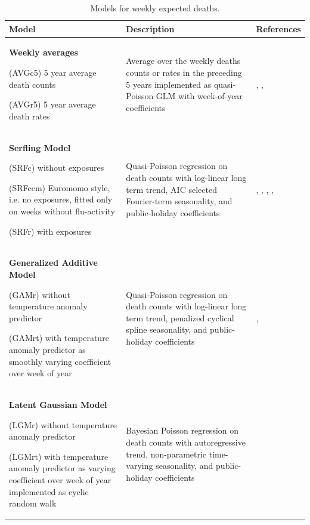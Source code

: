 \documentclass[12pt]{article}
\begin{document}
\begin{table}[H]
\small
\caption{Models for weekly expected deaths.}
\label{tab:models}
\begin{tabularx}{\textwidth} {
  >{\raggedright\arraybackslash}X
  >{\raggedright\arraybackslash}X
  >{\raggedright\arraybackslash}X }
\toprule
\textbf{Model} & \textbf{Description} & \textbf{References} \\ \midrule
\textbf{Weekly averages}\par
(AVGc5) 5 year average death counts\par
(AVGr5) 5 year average death rates
 &
 Average over the weekly deaths counts or rates in the preceding 5 years implemented as quasi-Poisson GLM with week-of-year coefficients
 &
\cite{Modig2020}, \cite{Stang2020}, \cite{Campbell2021}\\ \midrule
\textbf{Serfling Model}\par
(SRFc) without exposures\par
(SRFcem) Euromomo style, i.e. no exposures, fitted only on weeks without flu-activity\par
(SRFr) with exposures
&
Quasi-Poisson regression on death counts with log-linear long term trend, AIC selected Fourier-term seasonality, and public-holiday coefficients
&
\cite{Barnard2020}, \cite{Weinberger2020}, \cite{Woolf2020}, \cite{EuroMoMo2020}, \cite{Arolas2021}
\\ \midrule
\textbf{Generalized Additive Model}\par
(GAMr) without temperature anomaly predictor\par
(GAMrt) with temperature anomaly predictor as smoothly varying coefficient over week of year
&
Quasi-Poisson regression on death counts with log-linear long term trend, penalized cyclical spline seasonality, and public-holiday coefficients
&
\cite{Aburto2021}, \cite{Scortichini2020}
\\ \midrule
\textbf{Latent Gaussian Model}\par
(LGMr) without temperature anomaly predictor\par
(LGMrt) with temperature anomaly predictor as varying coefficient over week of year implemented as cyclic random walk\par
&
Bayesian Poisson regression on death counts with autoregressive trend, non-parametric time-varying seasonality, and public-holiday coefficients
&
\cite{Kontis2020}
\\ \bottomrule
\end{tabularx}
\end{table}
\end{document}
